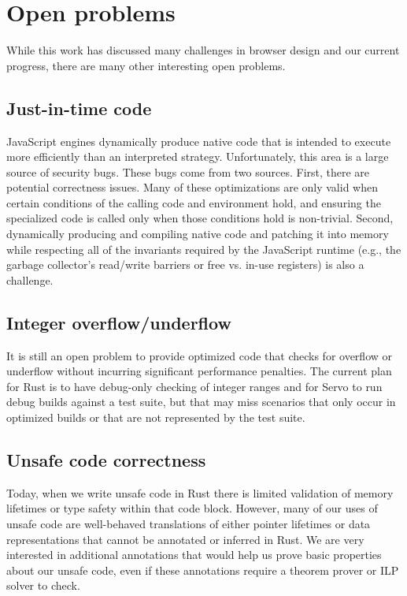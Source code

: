 
\section{Open problems}
\label{sec:open}
While this work has discussed many challenges in browser design and our current progress,
there are many other interesting open problems.

\subsection{Just-in-time code} JavaScript engines dynamically produce native code that is
intended to execute more efficiently than an interpreted strategy.
Unfortunately, this area is a large source of security bugs.
These bugs come from two sources.
First, there are potential correctness issues.
Many of these optimizations are only valid when certain conditions of the calling
code and environment hold, and ensuring the specialized code is called only when those
conditions hold is non-trivial.
Second, dynamically producing and compiling native code and patching it into memory
while respecting all of the invariants required by the JavaScript runtime (e.g., the
garbage collector's read/write barriers or free vs. in-use registers) is also a challenge.

\subsection{Integer overflow/underflow} It is still an open problem
to provide optimized code that checks for overflow or underflow without
incurring significant performance penalties.
The current plan for Rust is to have debug-only checking of integer ranges
and for Servo to run debug builds against a test suite, but that may miss
scenarios that only occur in optimized builds or that are not represented
by the test suite.

\subsection{Unsafe code correctness} Today, when we write unsafe code in Rust
there is limited validation of memory lifetimes or type safety within that
code block.
However, many of our uses of unsafe code are well-behaved translations of
either pointer lifetimes or data representations that cannot be annotated
or inferred in Rust.
We are very interested in additional annotations that would help us prove
basic properties about our unsafe code, even if these annotations require a
theorem prover or ILP solver to check.

